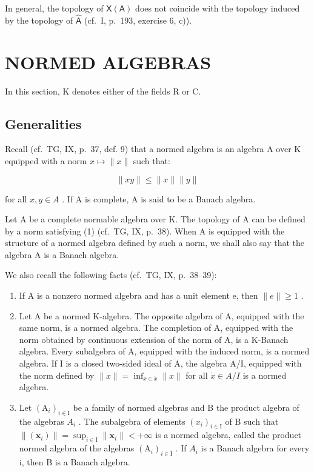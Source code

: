 In general, the topology of \(\mathsf{X}(\mathsf{A})\) does not coincide with the topology induced by the topology of \(\widehat{\mathsf{A}}\) (cf.~I, p.~193, exercise 6, c)).

\section{NORMED ALGEBRAS}

In this section, K denotes either of the fields R or C.

\subsection{Generalities}

Recall (cf.~TG, IX, p.~37, def. 9) that a normed algebra is an algebra A over K equipped with a norm \(x \mapsto \|x\|\) such that:

\[
\| x y \| \leqslant \| x \| \| y \|\tag{1}
\]

for all \(x, y \in A\) . If A is complete, A is said to be a Banach algebra.

Let A be a complete normable algebra over K. The topology of A can be defined by a norm satisfying (1) (cf.~TG, IX, p.~38). When A is equipped with the structure of a normed algebra defined by such a norm, we shall also say that the algebra A is a Banach algebra.

We also recall the following facts (cf.~TG, IX, p.~38--39):

\begin{enumerate}
\def\labelenumi{(\arabic{enumi})}
\item
  If A is a nonzero normed algebra and has a unit element e, then \(\|e\|\geqslant1\) .
\item
  Let A be a normed K-algebra. The opposite algebra of A, equipped with the same norm, is a normed algebra. The completion of A, equipped with the norm obtained by continuous extension of the norm of A, is a K-Banach algebra. Every subalgebra of A, equipped with the induced norm, is a normed algebra. If I is a closed two-sided ideal of A, the algebra A/I, equipped with the norm defined by \(\|\dot{x}\| = \inf_{x \in \dot{x}} \|x\|\) for all \(\dot{x} \in A/I\) is a normed algebra.
\item
  Let \((\mathrm{A}_{i})_{i\in\mathrm{I}}\) be a family of normed algebras and B the product algebra of the algebras \(A_{i}\) . The subalgebra of elements \((x_{i})_{i\in\mathrm{I}}\) of B such that \(\|(\boldsymbol{x}_{i})\|=\sup_{i\in\mathrm{I}}\|\boldsymbol{x}_{i}\|<+\infty\) is a normed algebra, called the product normed algebra of the algebras \((\mathrm{A}_{i})_{i\in\mathrm{I}}\) . If \(A_{i}\) is a Banach algebra for every i, then B is a Banach algebra.
\end{enumerate}

